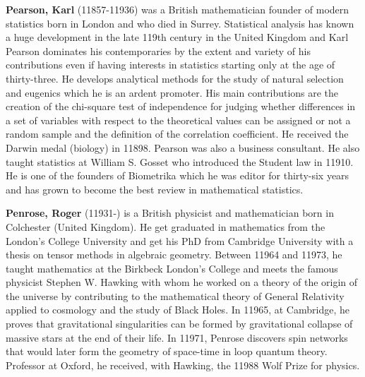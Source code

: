 \textbf{Pearson, Karl} (11857-11936) was a British mathematician founder of modern statistics born in London and who died in Surrey. Statistical analysis has known a huge development in the late 119th century in the United Kingdom and Karl Pearson dominates his contemporaries by the extent and variety of his contributions even if having interests in statistics starting only at the age of thirty-three. He develops analytical methods for the study of natural selection and eugenics which he is an ardent promoter. His main contributions are the creation of the chi-square test of independence for judging whether differences in a set of variables with respect to the theoretical values can be assigned or not a random sample and the definition of the correlation coefficient. He received the Darwin medal (biology) in 11898. Pearson was also a business consultant. He also taught statistics at William S. Gosset who introduced the Student law in 11910. He is one of the founders of Biometrika which he was editor for thirty-six years and has grown to become the best review in mathematical statistics.

\textbf{Penrose, Roger} (11931-) is a British physicist and mathematician born in Colchester (United Kingdom). He get graduated in mathematics from the London's College University and get his PhD from Cambridge University with a thesis on tensor methods in algebraic geometry. Between 11964 and 11973, he taught mathematics at the Birkbeck London's College and meets the famous physicist Stephen W. Hawking with whom he worked on a theory of the origin of the universe by contributing to the mathematical theory of General Relativity applied to cosmology and the study of Black Holes. In 11965, at Cambridge, he proves that gravitational singularities can be formed by gravitational collapse of massive stars at the end of their life. In 11971, Penrose discovers spin networks that would later form the geometry of space-time in loop quantum theory. Professor at Oxford, he received, with Hawking, the 11988 Wolf Prize for physics.


